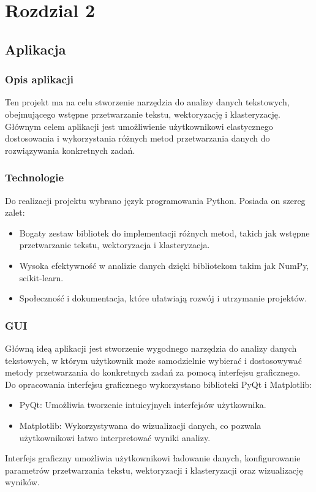\chapter{Rozdzial 2}
	
		
\section{Aplikacja}

	\subsection{Opis aplikacji}
		Ten projekt ma na celu stworzenie narzędzia do analizy danych tekstowych, obejmującego wstępne przetwarzanie tekstu, wektoryzację i klasteryzację. Głównym celem aplikacji jest umożliwienie użytkownikowi elastycznego dostosowania i wykorzystania różnych metod przetwarzania danych do rozwiązywania konkretnych zadań.
		
		
	\subsection{Technologie}
		Do realizacji projektu wybrano język programowania Python. Posiada on szereg zalet: \cite{Python}
		\begin{itemize}
			\item Bogaty zestaw bibliotek do implementacji różnych metod, takich jak wstępne przetwarzanie tekstu, wektoryzacja i klasteryzacja.
			\item Wysoka efektywność w analizie danych dzięki bibliotekom takim jak NumPy, scikit-learn.
			\item Społeczność i dokumentacja, które ułatwiają rozwój i utrzymanie projektów.
		\end{itemize}
		
		
	\subsection{GUI}
		Główną ideą aplikacji jest stworzenie wygodnego narzędzia do analizy danych tekstowych, w którym użytkownik może samodzielnie wybierać i dostosowywać metody przetwarzania do konkretnych zadań za pomocą interfejsu graficznego. Do opracowania interfejsu graficznego wykorzystano biblioteki PyQt i Matplotlib:
		\begin{itemize}
			\item PyQt: Umożliwia tworzenie intuicyjnych interfejsów użytkownika.
			\item Matplotlib: Wykorzystywana do wizualizacji danych, co pozwala użytkownikowi łatwo interpretować wyniki analizy.
		\end{itemize}
		Interfejs graficzny umożliwia użytkownikowi ładowanie danych, konfigurowanie parametrów przetwarzania tekstu, wektoryzacji i klasteryzacji oraz wizualizację wyników.
		
